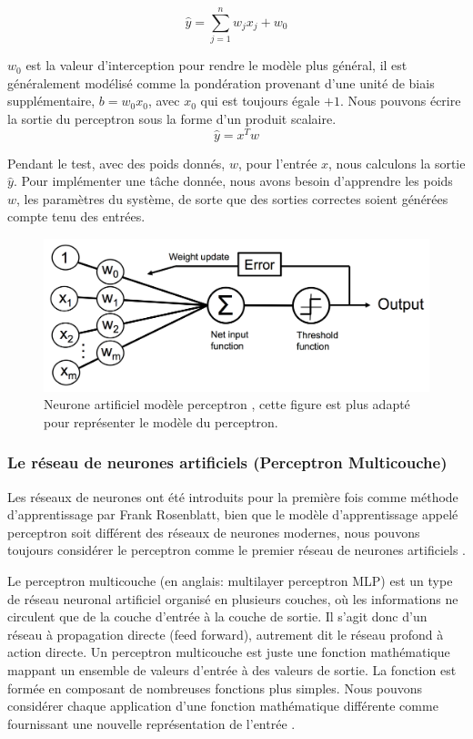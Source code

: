 	$$ {\hat{y} = \sum _{j=1}^{n}w_{j}x_{j} + w_0} $$
	
	$w_0$ est la valeur d'interception pour rendre le modèle plus général, il est généralement modélisé comme la pondération provenant d'une unité de biais supplémentaire, $b = w_0 x_0$, avec $x_0$ qui est toujours égale $+1$. Nous pouvons écrire la sortie du perceptron sous la forme d'un produit scalaire.
	$$ \hat{y} = x^Tw $$
	
	Pendant le test, avec des poids donnés, $w$, pour l'entrée $x$, nous calculons la sortie $\hat{y}$. Pour implémenter une tâche donnée, nous avons besoin d'apprendre les poids $w$, les paramètres du système, de sorte que des sorties correctes soient générées compte tenu des entrées.
	
	\begin{figure}[hth]%
		\centering
		\includegraphics[width=\textwidth]{images/perceptron_neuron.png}
		\caption[Neurone artificiel modèle perceptron.]{Neurone artificiel modèle perceptron \cite{ml2008python}, cette figure est plus adapté pour représenter le modèle du perceptron.}
		\label{fig:perceptron_neuron}
	\end{figure}

	
	
	\subsubsection{Le réseau de neurones artificiels (Perceptron Multicouche)}
	
	Les réseaux de neurones ont été introduits pour la première fois comme méthode d'apprentissage par Frank Rosenblatt, bien que le modèle d'apprentissage appelé perceptron soit différent des réseaux de neurones modernes, nous pouvons toujours considérer le perceptron comme le premier réseau de neurones artificiels \cite{sarkar2017practical}.
	
	Le perceptron multicouche (en anglais: multilayer perceptron MLP) est un type de réseau neuronal artificiel organisé en plusieurs couches, où les informations ne circulent que de la couche d'entrée à la couche de sortie. Il s'agit donc d'un réseau à propagation directe (feed forward), autrement dit le réseau profond à action directe. Un perceptron multicouche est juste une fonction mathématique mappant un ensemble de valeurs d'entrée à des valeurs de sortie. La fonction est formée en composant de nombreuses fonctions plus simples. Nous pouvons considérer chaque application d'une fonction mathématique différente comme fournissant une nouvelle représentation de l'entrée \cite{goodfellow2016deep,antoine2018apprentissage}.
	
